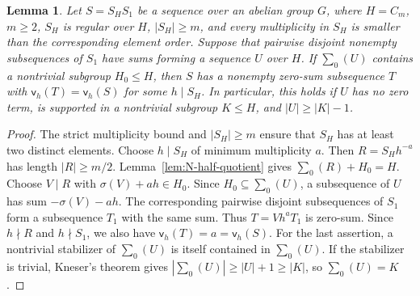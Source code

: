 \documentclass[10pt,reqno]{amsart}
\newtheorem{lem}[thm]{Lemma}
\theoremstyle{definition}
\theoremstyle{remark}
\numberwithin{equation}{section}
\begin{document}
\begin{lem}\label{lem:N-kernel-blocks}
Let $S=S_HS_1$ be a sequence over an abelian group $G$, where
$H=C_m$, $m\ge2$, $S_H$ is regular over $H$, $|S_H|\ge m$,
and every multiplicity in $S_H$ is smaller than the corresponding element order.
Suppose that pairwise disjoint nonempty subsequences of $S_1$ have sums
forming a sequence $U$ over $H$.
If $\sum_0(U)$ contains a nontrivial subgroup $H_0\le H$, then $S$
has a nonempty zero-sum subsequence $T$ with
$\mathsf v_h(T)=\mathsf v_h(S)$ for some $h\mid S_H$.
In particular, this holds if $U$ has no zero term, is supported in a
nontrivial subgroup $K\le H$, and $|U|\ge|K|-1$.
\end{lem}
\begin{proof}
The strict multiplicity bound and $|S_H|\ge m$ ensure that $S_H$
has at least two distinct elements. Choose $h\mid S_H$ of minimum multiplicity $a$. Then $R=S_Hh^{-a}$ has length $|R|\ge m/2$.
Lemma~\ref{lem:N-half-quotient} gives $\sum_0(R)+H_0=H$.
Choose $V\mid R$ with $\sigma(V)+ah\in H_0$.
Since $H_0\subseteq\sum_0(U)$, a subsequence of $U$ has sum
$-\sigma(V)-ah$. The corresponding pairwise disjoint subsequences of
$S_1$ form a subsequence $T_1$ with the same sum.
Thus $T=Vh^aT_1$ is zero-sum. Since $h\nmid R$ and $h\nmid S_1$,
we also have $\mathsf v_h(T)=a=\mathsf v_h(S)$.
For the last assertion, a nontrivial stabilizer of $\sum_0(U)$
is itself contained in $\sum_0(U)$.
If the stabilizer is trivial, Kneser's theorem gives
$|\sum_0(U)|\ge|U|+1\ge|K|$, so $\sum_0(U)=K$.
\end{proof}
\end{document}
